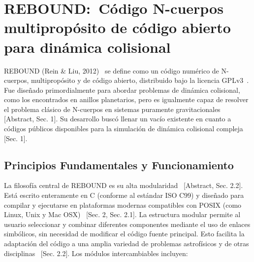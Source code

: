 \section[REBOUND]{REBOUND:\ Código N-cuerpos multipropósito de código abierto para dinámica colisional}

REBOUND (Rein \& Liu, 2012)~\cite{Rein2012} se define como un código numérico de N-cuerpos, multipropósito y de código abierto, distribuido bajo la licencia GPLv3~\cite{Rein2012}. Fue diseñado primordialmente para abordar problemas de dinámica colisional, como los encontrados en anillos planetarios, pero es igualmente capaz de resolver el problema clásico de N-cuerpos en sistemas puramente gravitacionales~\cite{Rein2012} [Abstract, Sec. 1]. Su desarrollo buscó llenar un vacío existente en cuanto a códigos públicos disponibles para la simulación de dinámica colisional compleja~\cite{Rein2012} [Sec. 1].

\subsection{Principios Fundamentales y Funcionamiento}

La filosofía central de REBOUND es su alta modularidad~\cite{Rein2012} [Abstract, Sec. 2.2]. Está escrito enteramente en C (conforme al estándar ISO C99) y diseñado para compilar y ejecutarse en plataformas modernas compatibles con POSIX (como Linux, Unix y Mac OSX)~\cite{Rein2012} [Sec. 2, Sec. 2.1]. La estructura modular permite al usuario seleccionar y combinar diferentes componentes mediante el uso de enlaces simbólicos, sin necesidad de modificar el código fuente principal. Esto facilita la adaptación del código a una amplia variedad de problemas astrofísicos y de otras disciplinas~\cite{Rein2012} [Sec. 2.2]. Los módulos intercambiables incluyen:

